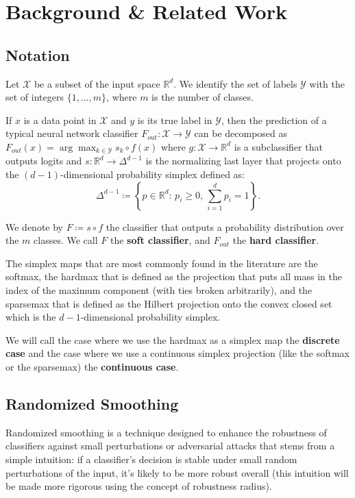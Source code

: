 \section{Background \& Related Work}\label{sec:background-&-related-work}

\subsection{Notation}\label{subsec:notation}
Let $\mathcal{X}$ be a subset of the input space $\mathbb{R}^d$.
We identify the set of labels $\mathcal{Y}$ with the set of integers $\{1, \ldots, m\}$, where $m$ is the number of classes.

If $x$ is a data point in $\mathcal{X}$ and $y$ is its true label in $\mathcal{Y}$, then the prediction of a typical neural network classifier $F_{out}: \mathcal{X} \rightarrow \mathcal{Y}$ can be decomposed as $F_{out}(x)=\arg\max_{k \in \mathcal{Y}}s_k\circ f(x)$ where $g: \mathcal{X} \rightarrow \mathbb{R}^d$ is a subclassifier that outputs logits
and $s: \mathbb{R}^d \rightarrow \Delta^{d-1}$ is the normalizing last layer that projects onto the $(d-1)$-dimensional probability simplex defined as:
\[
    \Delta^{d-1} \coloneqq \left\{p \in \mathbb{R}^d : \, p_i \geq 0, \,\sum_{i=1}^d p_i = 1 \right\}.
\]

We denote by $F\coloneqq s\circ f$ the classifier that outputs a probability distribution over the $m$ classes.
We call $F$ the \textbf{soft classifier}, and $F_{out}$ the \textbf{hard classifier}.

The simplex maps that are most commonly found in the literature are the softmax, the hardmax that is defined as the projection that puts all mass in the index of the maximum component (with ties broken arbitrarily), and the sparsemax that is defined as the Hilbert projection onto the convex closed set which is the $d-1$-dimensional probability simplex.

We will call the case where we use the hardmax as a simplex map the \textbf{discrete case} and the case where we use a continuous simplex projection (like the softmax or the sparsemax) the \textbf{continuous case}.

\subsection{Randomized Smoothing}\label{subsec:randomized-smoothing}
Randomized smoothing is a technique designed to enhance the robustness of classifiers against small perturbations or adversarial attacks that stems from a simple intuition: if a classifier's decision is stable under small random perturbations of the input, it's likely to be more robust overall (this intuition will be made more rigorous using the concept of robustness radius).


